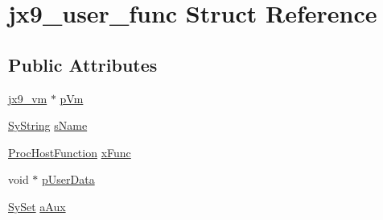 \hypertarget{structjx9__user__func}{\section{jx9\-\_\-user\-\_\-func Struct Reference}
\label{d5/def/structjx9__user__func}
}
\subsection*{Public Attributes}
\begin{DoxyCompactItemize}
\item 
\hyperlink{structjx9__vm}{jx9\-\_\-vm} $\ast$ \hyperlink{structjx9__user__func_a73006422c356264709dfdf281055029b}{p\-Vm}
\item 
\hyperlink{struct_sy_string}{Sy\-String} \hyperlink{structjx9__user__func_a021210bf814fec1bb29833c2b7dde0ca}{s\-Name}
\item 
\hyperlink{unqlite_8c_a6bc67af6d701fce5bf74262b4ee4da2d}{Proc\-Host\-Function} \hyperlink{structjx9__user__func_ae470be88ef4cfb8556882f57aa0353e0}{x\-Func}
\item 
void $\ast$ \hyperlink{structjx9__user__func_a7a0d58b59618f1473dc231d979b8da63}{p\-User\-Data}
\item 
\hyperlink{struct_sy_set}{Sy\-Set} \hyperlink{structjx9__user__func_af7b4ddae5c686587fa9372786d632ba7}{a\-Aux}
\end{DoxyCompactItemize}


